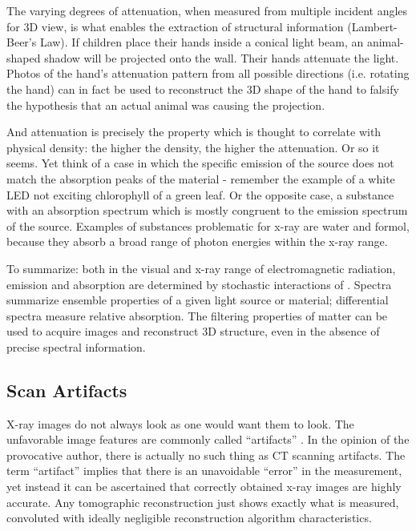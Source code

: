 The varying degrees of attenuation, when measured from multiple incident angles for 3D view, is what enables the extraction of structural information (Lambert-Beer's Law).
If children place their hands inside a conical light beam, an animal-shaped shadow will be projected onto the wall.
Their hands attenuate the light.
Photos of the hand's attenuation pattern from all possible directions (i.e. rotating the hand) can in fact be used to reconstruct the 3D shape of the hand to falsify the hypothesis that an actual animal was causing the projection.

And attenuation is precisely the property which is thought to correlate with physical density: the higher the density, the higher the attenuation.
Or so it seems.
Yet think of a case in which the specific emission of the source does not match the absorption peaks of the material - remember the example of a white LED not exciting chlorophyll of a green leaf.
Or the opposite case, a substance with an absorption spectrum which is mostly congruent to the emission spectrum of the source.
Examples of substances problematic for x-ray are water and formol, because they absorb a broad range of photon energies within the x-ray range.


To summarize: both in the visual and x-ray range of electromagnetic radiation, emission and absorption are determined by stochastic interactions of .
Spectra summarize ensemble properties of a given light source or material; differential spectra measure relative absorption.
The filtering properties of matter can be used to acquire images and reconstruct 3D structure, even in the absence of precise spectral information.


\subsection{Scan Artifacts}
\label{sec:orgbfc8495}
X-ray images do not always look as one would want them to look.
The unfavorable image features are commonly called ``artifacts'' \citep{Triche2019}.
In the opinion of the provocative author, there is actually no such thing as CT scanning artifacts.
The term ``artifact'' implies that there is an unavoidable ``error'' in the measurement, yet instead it can be ascertained that correctly obtained x-ray images are highly accurate.
Any tomographic reconstruction just shows exactly what is measured, convoluted with ideally negligible reconstruction algorithm characteristics.


